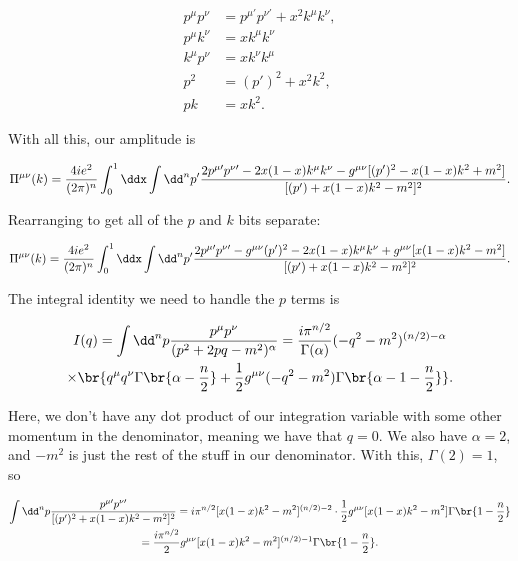 \documentclass[titlepage]{article}
\begin{document}
\begin{align}
    p^{\mu}p^{\nu} &= p^{\mu\prime}p^{\nu\prime} + x^2k^{\mu}k^{\nu}, \\
    p^{\mu}k^{\nu} &= xk^{\mu}k^{\nu} \\
    k^{\mu}p^{\nu} &= xk^{\nu}k^{\mu} \\
    p^2 &= (p')^2 + x^2k^2, \\
    pk &= xk^2.
\end{align}

With all this, our amplitude is

\begin{equation}
    \Pi^{\mu\nu}(k) = \frac{4ie^2}{(2\pi)^n} \int_0^1 \ddx \int \dd^np' \frac{2p^{\mu\prime}p^{\nu\prime} - 2x(1-x)k^{\mu}k^{\nu} - g^{\mu\nu}[(p')^2 - x(1-x)k^2 + m^2]}{[(p') + x(1-x)k^2 - m^2]^2}.
\end{equation}

Rearranging to get all of the $p$ and $k$ bits separate:

\begin{equation}
    \Pi^{\mu\nu}(k) = \frac{4ie^2}{(2\pi)^n} \int_0^1 \ddx \int \dd^np' \frac{2p^{\mu\prime}p^{\nu\prime} - g^{\mu\nu}(p')^2 - 2x(1-x)k^{\mu}k^{\nu} + g^{\mu\nu}[x(1-x)k^2 - m^2]}{[(p') + x(1-x)k^2 - m^2]^2}.
\end{equation}

The integral identity we need to handle the $p$ terms is

\begin{multline}
    I(q) = \int \dd^np \frac{p^{\mu}p^{\nu}}{(p^2 + 2pq - m^2)^{\alpha}} = \frac{i\pi^{n/2}}{\Gamma(\alpha)}(-q^2-m^2)^{(n/2)-\alpha} \\ \times \br{q^{\mu}q^{\nu} \Gamma\br{\alpha - \frac{n}{2}} + \frac{1}{2}g^{\mu\nu}(-q^2-m^2)\Gamma\br{\alpha-1-\frac{n}{2}}}.
\end{multline}

Here, we don't have any dot product of our integration variable with some other momentum in the denominator, meaning we have that $q=0$. We also have $\alpha=2$, and $-m^2$ is just the rest of the stuff in our denominator. With this, $\Gamma(2) = 1$, so

\begin{gather}
    \int \dd^np \frac{p^{\mu\prime}p^{\nu\prime}}{[(p')^2 + x(1-x)k^2 - m^2]^2} = i\pi^{n/2}[x(1-x)k^2-m^2]^{(n/2)-2} \cdot \frac{1}{2}g^{\mu\nu}[x(1-x)k^2-m^2]\Gamma\br{1 - \frac{n}{2}} \\
    = \frac{i\pi^{n/2}}{2}g^{\mu\nu}[x(1-x)k^2-m^2]^{(n/2)-1}\Gamma\br{1 - \frac{n}{2}}.
\end{gather}
\end{document}
